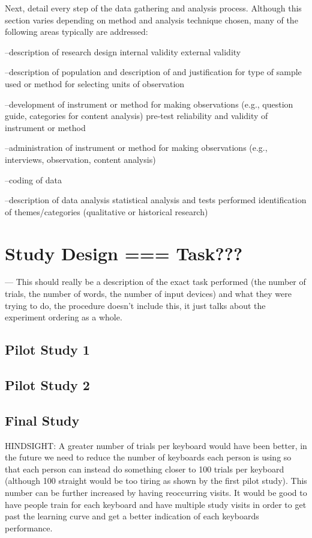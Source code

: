  Next, detail every step of the data gathering and analysis process. Although this section varies depending
on method and analysis technique chosen, many of the following areas typically are addressed:

--description of research design
 internal validity
 external validity

--description of population and description of and justification for type of sample used or method for
selecting units of observation

--development of instrument or method for making observations (e.g., question guide, categories for content
analysis)
 pre-test
 reliability and validity of instrument or method

--administration of instrument or method for making observations (e.g., interviews, observation, content
analysis)

--coding of data

--description of data analysis
 statistical analysis and tests performed
 identification of themes/categories (qualitative or historical research) 

\section{Study Design === Task???}

--- This should really be a description of the exact task performed (the number of trials, the number of words, the number of input devices) and what they were trying to do, the procedure doesn't include this, it just talks about the experiment ordering as a whole.

\subsection{Pilot Study 1}

\subsection{Pilot Study 2}

\subsection{Final Study}

HINDSIGHT:
A greater number of trials per keyboard would have been better, in the future we need to reduce the number of keyboards each person is using so that each person can instead do something closer to 100 trials per keyboard (although 100 straight would be too tiring as shown by the first pilot study). This number can be further increased by having reoccurring visits. It would be good to have people train for each keyboard and have multiple study visits in order to get past the learning curve and get a better indication of each keyboards performance.

